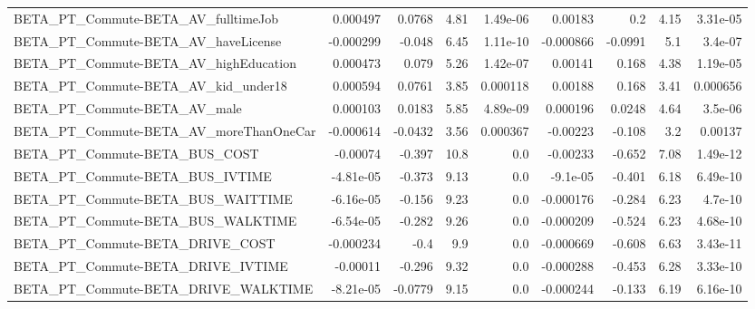 \begin{tabular}{lrrrrrrrr}
BETA\_PT\_Commute-BETA\_AV\_fulltimeJob                &    0.000497 &       0.0768 &     4.81 & 1.49e-06 &    0.00183 &         0.2 &         4.15 &      3.31e-05 \\
BETA\_PT\_Commute-BETA\_AV\_haveLicense                &   -0.000299 &       -0.048 &     6.45 & 1.11e-10 &  -0.000866 &     -0.0991 &          5.1 &       3.4e-07 \\
BETA\_PT\_Commute-BETA\_AV\_highEducation              &    0.000473 &        0.079 &     5.26 & 1.42e-07 &    0.00141 &       0.168 &         4.38 &      1.19e-05 \\
BETA\_PT\_Commute-BETA\_AV\_kid\_under18                &    0.000594 &       0.0761 &     3.85 & 0.000118 &    0.00188 &       0.168 &         3.41 &      0.000656 \\
BETA\_PT\_Commute-BETA\_AV\_male                       &    0.000103 &       0.0183 &     5.85 & 4.89e-09 &   0.000196 &      0.0248 &         4.64 &       3.5e-06 \\
BETA\_PT\_Commute-BETA\_AV\_moreThanOneCar             &   -0.000614 &      -0.0432 &     3.56 & 0.000367 &   -0.00223 &      -0.108 &          3.2 &       0.00137 \\
BETA\_PT\_Commute-BETA\_BUS\_COST                      &    -0.00074 &       -0.397 &     10.8 &      0.0 &   -0.00233 &      -0.652 &         7.08 &      1.49e-12 \\
BETA\_PT\_Commute-BETA\_BUS\_IVTIME                    &   -4.81e-05 &       -0.373 &     9.13 &      0.0 &   -9.1e-05 &      -0.401 &         6.18 &      6.49e-10 \\
BETA\_PT\_Commute-BETA\_BUS\_WAITTIME                  &   -6.16e-05 &       -0.156 &     9.23 &      0.0 &  -0.000176 &      -0.284 &         6.23 &       4.7e-10 \\
BETA\_PT\_Commute-BETA\_BUS\_WALKTIME                  &   -6.54e-05 &       -0.282 &     9.26 &      0.0 &  -0.000209 &      -0.524 &         6.23 &      4.68e-10 \\
BETA\_PT\_Commute-BETA\_DRIVE\_COST                    &   -0.000234 &         -0.4 &      9.9 &      0.0 &  -0.000669 &      -0.608 &         6.63 &      3.43e-11 \\
BETA\_PT\_Commute-BETA\_DRIVE\_IVTIME                  &    -0.00011 &       -0.296 &     9.32 &      0.0 &  -0.000288 &      -0.453 &         6.28 &      3.33e-10 \\
BETA\_PT\_Commute-BETA\_DRIVE\_WALKTIME                &   -8.21e-05 &      -0.0779 &     9.15 &      0.0 &  -0.000244 &      -0.133 &         6.19 &      6.16e-10 \\

\end{tabular}

